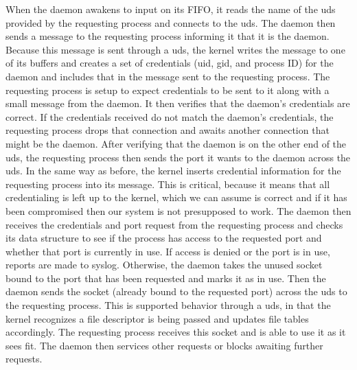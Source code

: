 \documentclass{sig-alternate}
\begin{document}
	When the daemon awakens to input on its FIFO, it reads the name of the uds provided by the requesting process and connects to the uds. The daemon then sends a message to the requesting process informing it that it is the daemon. Because this message is sent through a uds, the kernel writes the message to one of its buffers and creates a set of credentials (uid, gid, and process ID) for the daemon and includes that in the message sent to the requesting process. The requesting process is setup to expect credentials to be sent to it along with a small message from the daemon. It then verifies that the daemon's credentials are correct. If the credentials received do not match the daemon's credentials, the requesting process drops that connection and awaits another connection that might be the daemon. After verifying that the daemon is on the other end of the uds, the requesting process then sends the port it wants to the daemon across the uds. In the same way as before, the kernel inserts credential information for the requesting process into its message. This is critical, because it means that all credentialing is left up to the kernel, which we can assume is correct and if it has been compromised then our system is not presupposed to work. The daemon then receives the credentials and port request from the requesting process and checks its data structure to see if the process has access to the requested port and whether that port is currently in use. If access is denied or the port is in use, reports are made to syslog. Otherwise, the daemon takes the unused socket bound to the port that has been requested and marks it as in use. Then the daemon sends the socket (already bound to the requested port) across the uds to the requesting process. This is supported behavior through a uds, in that the kernel recognizes a file descriptor is being passed and updates file tables accordingly. The requesting process receives this socket and is able to use it as it sees fit. The daemon then services other requests or blocks awaiting further requests.
	
\end{document}
